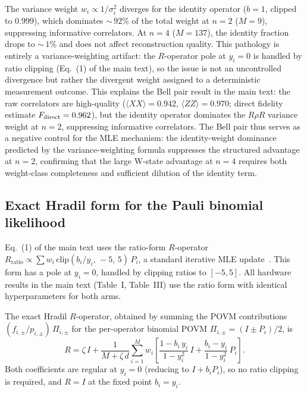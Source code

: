 \documentclass[twocolumn,prx,aps,superscriptaddress,longbibliography]{revtex4-2}
\begin{document}
The variance weight $w_i \propto 1/\sigma_i^2$ diverges for the
identity operator ($b = 1$, clipped to $0.999$), which dominates
${\sim}\,92$\% of the total weight at $n = 2$ ($M = 9$), suppressing
informative correlators.  At $n = 4$ ($M = 137$), the identity
fraction drops to ${\sim}\,1$\% and does not affect reconstruction
quality.
This pathology is entirely a variance-weighting artifact: the
$R$-operator pole at $y_i = 0$ is handled by ratio clipping
(Eq.~(1) of the main text), so the issue is not
an uncontrolled divergence but rather the divergent weight assigned to
a deterministic measurement outcome.
This explains the Bell pair result in the main text: the
raw correlators are high-quality ($\langle XX\rangle = 0.942$,
$\langle ZZ\rangle = 0.970$; direct fidelity
estimate $F_{\rm direct} = 0.962$), but the identity operator
dominates the $R\rho R$ variance weight at $n = 2$, suppressing
informative correlators.  The Bell pair thus serves as a negative
control for the MLE mechanism: the identity-weight dominance predicted
by the variance-weighting formula suppresses the structured advantage
at $n = 2$, confirming that the large W-state advantage at $n = 4$
requires both weight-class completeness and sufficient dilution of
the identity term.

\subsection{Exact Hradil form for the Pauli binomial likelihood}
\label{sec:hradil-comparison}

Eq.~(1) of the main text uses the ratio-form $R$-operator
$R_{\mathrm{ratio}} \propto \sum w_i\, \mathrm{clip}(b_i/y_i,\, {-}5,\, 5)\, P_i$,
a standard iterative MLE update~\cite{Hradil1997,Paris2004}.
This form has a pole at $y_i = 0$, handled by clipping ratios
to $[-5, 5]$.
All hardware results in the main text (Table~I, Table~III) use
the ratio form with identical hyperparameters for both arms.

The exact Hradil $R$-operator, obtained by summing the POVM
contributions $(f_{i,\pm}/p_{i,\pm})\,\Pi_{i,\pm}$ for the
per-operator binomial POVM
$\Pi_{i,\pm} = (I \pm P_i)/2$, is
\begin{equation}\label{eq:hradil-exact}
  R = \zeta\, I + \frac{1}{M + \zeta\, d}
  \sum_{i=1}^{M} w_i\!\left[
  \frac{1 - b_i\, y_i}{1 - y_i^2}\, I
  + \frac{b_i - y_i}{1 - y_i^2}\, P_i\right].
\end{equation}
Both coefficients are regular at $y_i = 0$ (reducing to $I + b_i P_i$),
so no ratio clipping is required, and $R = I$ at the fixed point
$b_i = y_i$.
\end{document}
